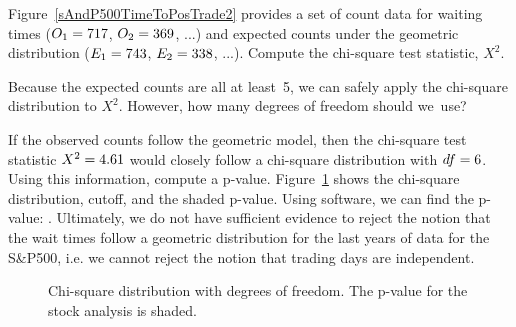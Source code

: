 \begin{exercisewrap}
\begin{nexercise}
Figure~\ref{sAndP500TimeToPosTrade2}
provides a set of count data for waiting times
($O_1=717{}$, $O_2=369{}$, ...)
and expected counts under the geometric distribution
($E_1=743{}$, $E_2=338{}$, ...).
Compute the chi-square test statistic, $X^2$.\footnotemark
\end{nexercise}
\end{exercisewrap}

\begin{exercisewrap}
\begin{nexercise}
Because the expected counts are all at least~5,
we can safely apply the chi-square distribution to $X^2$.
However, how many degrees of freedom should
we~use?\footnotemark{}
\end{nexercise}
\end{exercisewrap}

\begin{examplewrap}
\begin{nexample}{If the observed counts follow the
    geometric model, then the chi-square test statistic
    $X^2 = 4.61{}$ would closely follow a chi-square
    distribution with $df = 6{}$.
    Using this information, compute a p-value.} 
  \label{DNRejectGeomModelForSP500}%
  Figure~\ref{geomFitPValueForSP500} shows the
  chi-square distribution, cutoff, and the shaded p-value.
  Using software, we can find the p-value: \spdaysPvalue{}.
  Ultimately, we do not have sufficient evidence to reject
  the notion that the wait times follow a geometric
  distribution for the last \spyears{} years of data
  for the S\&P500,
  i.e. we cannot reject the notion that trading days
  are independent.
\end{nexample}
\end{examplewrap}

\begin{figure}[h]
  \centering
  \caption{Chi-square distribution with \spdaysDF{}
      degrees of freedom.
      The p-value for the stock analysis is shaded.}
  \label{geomFitPValueForSP500}
\end{figure}

